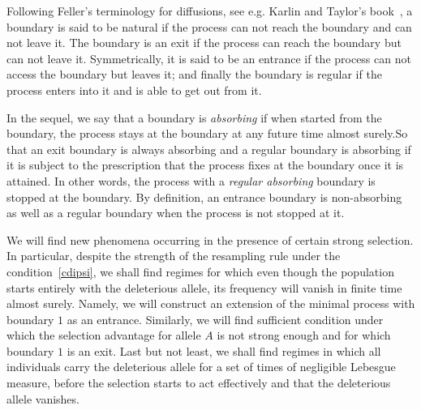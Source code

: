\documentclass[10pt]{amsart}
\theoremstyle{definition}\newtheorem{defi}[theo]{Definition}\newtheorem{rema}[theo]{Remark}\newtheorem{exam}[theo]{Example}\newtheorem{exem}[theo]{Example}\newtheorem{nota}[theo]{Notation}
\begin{document}
Following Feller's terminology for diffusions, see e.g. Karlin and Taylor's book~\cite[Chapter~15, Section~6]{MR611513}, a boundary is said to be natural if the process can not reach the boundary and can not leave it. The boundary is an exit if the process can reach the boundary but can not leave it. Symmetrically, it is said to be an entrance if the process can not access the boundary but leaves it; and finally the boundary is regular if the process enters into it and is able to get out from it.

In the sequel, we say that a boundary is \emph{absorbing} if when started from the boundary, the process stays at the boundary at any future time almost surely.\linebreak So that an exit boundary is always absorbing and a regular boundary is absorbing if it is subject to the prescription that the process fixes at the boundary once it is attained. In other words, the process with a \emph{regular absorbing} boundary is stopped at the boundary. By definition, an entrance boundary is non-absorbing as well as a regular boundary when the process is not stopped at it.

We will find new phenomena occurring in the presence of certain strong selection. In particular, despite the strength of the resampling rule under the condition~\eqref{cdipsi}, we shall find regimes for which even though the population starts entirely with the deleterious allele, its frequency will vanish in finite time almost surely. Namely, we will construct an extension of the minimal process with boundary $1$ as an entrance. Similarly, we will find sufficient condition under which the selection advantage for allele $A$ is not strong enough and for which boundary $1$ is an exit. Last but not least, we shall find regimes in which all individuals carry the deleterious allele for a set of times of negligible Lebesgue measure, before the selection starts to act effectively and that the deleterious allele vanishes.
\end{document}
